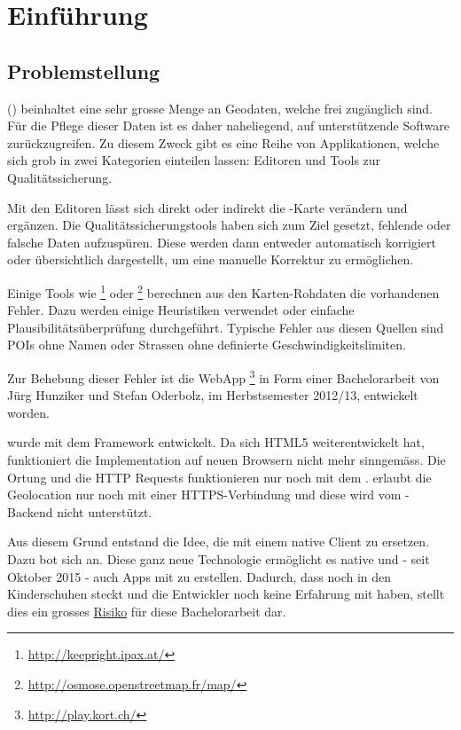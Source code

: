 \chapter{Einführung}
\label{tb-einfuehrung}

\section{Problemstellung}
 () beinhaltet eine sehr grosse Menge an Geodaten, welche frei zugänglich sind.
Für die Pflege dieser Daten ist es daher naheliegend, auf unterstützende Software zurückzugreifen.
Zu diesem Zweck gibt es eine Reihe von Applikationen, welche sich grob in zwei Kategorien einteilen lassen:
Editoren und Tools zur Qualitätssicherung.

Mit den Editoren lässt sich direkt oder indirekt die -Karte verändern und ergänzen.
Die Qualitätssicherungstools haben sich zum Ziel gesetzt, fehlende oder falsche Daten aufzuspüren.
Diese werden dann entweder automatisch korrigiert oder übersichtlich dargestellt, um eine manuelle Korrektur zu ermöglichen.

Einige Tools wie \footnote{\url{http://keepright.ipax.at/}} oder \footnote{\url{http://osmose.openstreetmap.fr/map/}} berechnen aus den Karten-Rohdaten die vorhandenen Fehler.
Dazu werden einige Heuristiken verwendet oder einfache Plausibilitätsüberprüfung durchgeführt.
Typische Fehler aus diesen Quellen sind \glspl{POI} ohne Namen oder Strassen ohne definierte Geschwindigkeitslimiten.\cite{ba-kort-2012}

Zur Behebung dieser Fehler ist die \gls{WebApp} \kort{}\footnote{\url{http://play.kort.ch/}} in Form einer Bachelorarbeit von Jürg Hunziker und Stefan Oderbolz, im Herbstsemester 2012/13, entwickelt  worden.\cite{ba-kort-2012}

\kort{} wurde mit dem  \gls{Framework} entwickelt.
Da sich HTML5 weiterentwickelt hat, funktioniert die Implementation auf neuen Browsern nicht mehr sinngemäss.
Die Ortung und die HTTP Requests funktionieren nur noch mit dem .
 erlaubt die Geolocation nur noch mit einer HTTPS-Verbindung und diese wird vom \kort{}-Backend nicht unterstützt.

Aus diesem Grund entstand die Idee, die \kort{} mit einem native Client zu ersetzen.
Dazu bot sich  an. 
Diese ganz neue Technologie ermöglicht es native  und - seit Oktober 2015 - auch  Apps mit  zu erstellen. 
Dadurch, dass  noch in den Kinderschuhen steckt und die Entwickler noch keine Erfahrung mit  haben, stellt dies ein grosses \hyperref[pm-projektmanagement-risikomanagement]{Risiko} für diese Bachelorarbeit dar.


